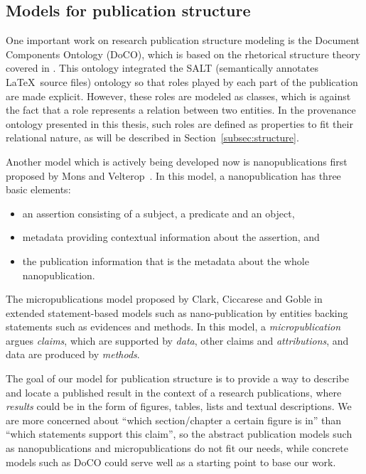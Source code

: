 \subsection{Models for publication structure}
One important work on research publication structure modeling is the Document Components Ontology (DoCO), which is based on the rhetorical structure theory covered in \cite{taboada2006rhetorical}. This ontology integrated the SALT \cite{groza2007salt} (semantically annotates \LaTeX \ source files) ontology so that roles played by each part of the publication are made explicit. However, these roles are modeled as classes, which is against the fact that a role represents a relation between two entities. In the provenance ontology presented in this thesis, such roles are defined as properties to fit their relational nature, as will be described in Section~\ref{subsec:structure}.

Another model which is actively being developed now is nanopublications first proposed by Mons and Velterop~\cite{mons2009nano}. In this model, a nanopublication has three basic elements:
\begin{itemize}
	\item an assertion consisting of a subject, a predicate and an object,
	\item metadata providing contextual information about the assertion, and
	\item the publication information that is the metadata about the whole nanopublication.
\end{itemize}

The micropublications model proposed by Clark, Ciccarese and Goble in \cite{clark2013micropublications} extended statement-based models such as nano-publication by entities backing statements such as evidences and methods. In this model, a \emph{micropublication} argues \emph{claims}, which are supported by \emph{data}, other claims and \emph{attributions}, and data are produced by \emph{methods}.

The goal of our model for publication structure is to provide a way to describe and locate a published result in the context of a research publications, where \emph{results} could be in the form of figures, tables, lists and textual descriptions. We are more concerned about ``which section/chapter a certain figure is in'' than ``which statements support this claim'', so the abstract publication models such as nanopublications and micropublications do not fit our needs, while concrete models such as DoCO could serve well as a starting point to base our work.

